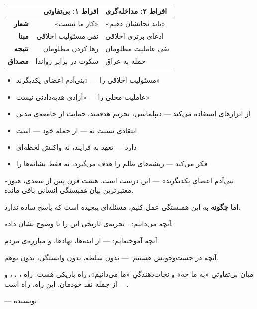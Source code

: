 \begin{tcolorbox}[mybox, title={خلاصه‌ی فصل: سه موضع در قبال رنج دیگران}]
\begin{table}[H]
\centering
\begin{tabularx}{\textwidth}{r|r|X}
\toprule
& \textbf{افراط ۱: بی‌تفاوتی} & \textbf{افراط ۲: مداخله‌گری} \\
\midrule
\textbf{شعار} & «کار ما نیست» & «باید نجاتشان دهیم» \\
\textbf{مبنا} & نفی مسئولیت اخلاقی & ادعای برتری اخلاقی \\
\textbf{نتیجه} & رها کردن مظلومان & نفی عاملیت مظلومان \\
\textbf{مصداق} & سکوت در برابر رواندا & حمله به عراق \\
\bottomrule
\end{tabularx}
\end{table}
\end{tcolorbox}

\begin{tcolorbox}[successbox, title={راه سوم: همبستگی انتقادی}]
\begin{itemize}
\item مسئولیت اخلاقی را  — «بنی‌آدم اعضای یکدیگرند»
\item عاملیت محلی را  — «آزادی هدیه‌دادنی نیست»
\item از ابزارهای  استفاده می‌کند — دیپلماسی، تحریم
  هدفمند، حمایت از جامعه‌ی مدنی
\item انتقادی نسبت به  — از جمله خود — است
\item {} دارد — تعهد به فرایند، نه واکنش لحظه‌ای
\item {} فکر می‌کند — ریشه‌های ظلم را هدف می‌گیرد، نه فقط
  نشانه‌ها را
\end{itemize}
\end{tcolorbox}

\begin{tcolorbox}[quotebox, title={سخن پایانی}]
«بنی‌آدم اعضای یکدیگرند» — این درست است. هشت قرن پس از سعدی، هنوز
معتبرترین بیان همبستگی انسانی باقی مانده.

اما \textbf{چگونه} به این همبستگی عمل کنیم، مسئله‌ای پیچیده است که پاسخ
ساده ندارد.

آنچه می‌دانیم: . تجربه‌ی
تاریخی این را با وضوح نشان داده.

آنچه آموخته‌ایم:  — از ایده‌ها،
نهادها، و مبارزه‌ی مردم.

آنچه در جست‌وجویش هستیم:  — بدون سلطه، بدون وابستگی، بدون توهم.

میان بی‌تفاوتیِ «به ما چه» و نجات‌دهندگیِ «ما می‌دانیم»، راه باریکی
هست. راه ، ، ،
و  — از جمله نقد خودمان. این راه، راه
 است.

\vspace{0.5em}
— نویسنده
\end{tcolorbox}

\cleardoublepage